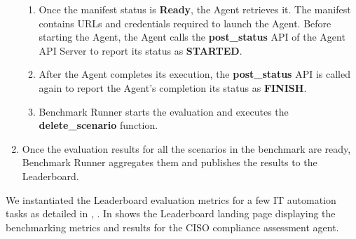 \begin{enumerate}[left=0pt, topsep=0pt, partopsep=0pt, itemsep=0pt, parsep=0pt]
\begin{enumerate}
            \item Once the manifest status is \textbf{Ready}, the Agent retrieves it. The manifest contains URLs and credentials required to launch the Agent. Before starting the Agent, the Agent calls the \textbf{post\_status} API of the Agent API Server to report its status as \textbf{STARTED}.
            \item After the Agent completes its execution, the \textbf{post\_status} API is called again to report the Agent’s completion its status as \textbf{FINISH}.
            \item Benchmark Runner starts the evaluation and executes the \textbf{delete\_scenario} function.
        \end{enumerate}
    \item Once the evaluation results for all the scenarios in the benchmark are ready, Benchmark Runner aggregates them and publishes the results to the Leaderboard.
\end{enumerate}




We instantiated the Leaderboard evaluation metrics for a few IT automation tasks as detailed in , . 
In  shows the Leaderboard landing page displaying the benchmarking metrics and results for the CISO compliance assessment agent.







